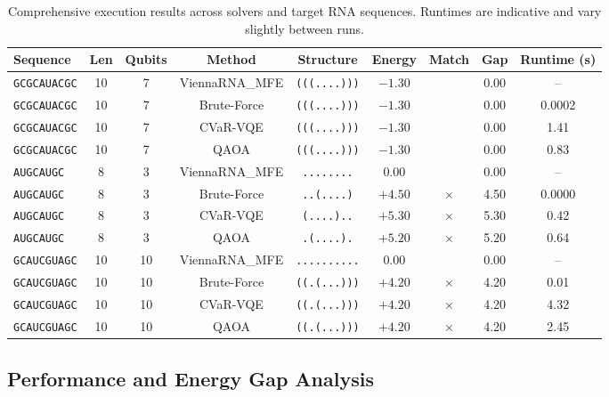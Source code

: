 \documentclass[11pt,a4paper]{article}
\begin{document}
	\begin{table}[htbp]
		\centering
		\caption{Comprehensive execution results across solvers and target RNA sequences. Runtimes are indicative and vary slightly between runs.}
		\label{tab:combined_results}
		\small
		\begin{tabular}{lcccccccc}
			\hline
			\textbf{Sequence} & \textbf{Len} & \textbf{Qubits} & \textbf{Method} & \textbf{Structure} & \textbf{Energy} & \textbf{Match} & \textbf{Gap} & \textbf{Runtime (s)} \\
			\hline
			\texttt{GCGCAUACGC} & 10 & 7 & ViennaRNA\_MFE & \texttt{(((....)))} & $-1.30$ & \checkmark & 0.00 & -- \\
			\texttt{GCGCAUACGC} & 10 & 7 & Brute-Force & \texttt{(((....)))} & $-1.30$ & \checkmark & 0.00 & 0.0002 \\
			\texttt{GCGCAUACGC} & 10 & 7 & CVaR-VQE & \texttt{(((....)))} & $-1.30$ & \checkmark & 0.00 & 1.41 \\
			\texttt{GCGCAUACGC} & 10 & 7 & QAOA & \texttt{(((....)))} & $-1.30$ & \checkmark & 0.00 & 0.83 \\
			\hline
			\texttt{AUGCAUGC} & 8 & 3 & ViennaRNA\_MFE & \texttt{........} & $0.00$ & \checkmark & 0.00 & -- \\
			\texttt{AUGCAUGC} & 8 & 3 & Brute-Force & \texttt{..(....)} & $+4.50$ & $\times$ & 4.50 & 0.0000 \\
			\texttt{AUGCAUGC} & 8 & 3 & CVaR-VQE & \texttt{(....)..} & $+5.30$ & $\times$ & 5.30 & 0.42 \\
			\texttt{AUGCAUGC} & 8 & 3 & QAOA & \texttt{.(....).} & $+5.20$ & $\times$ & 5.20 & 0.64 \\
			\hline
			\texttt{GCAUCGUAGC} & 10 & 10 & ViennaRNA\_MFE & \texttt{..........} & $0.00$ & \checkmark & 0.00 & -- \\
			\texttt{GCAUCGUAGC} & 10 & 10 & Brute-Force & \texttt{((.(...)))} & $+4.20$ & $\times$ & 4.20 & 0.01 \\
			\texttt{GCAUCGUAGC} & 10 & 10 & CVaR-VQE & \texttt{((.(...)))} & $+4.20$ & $\times$ & 4.20 & 4.32 \\
			\texttt{GCAUCGUAGC} & 10 & 10 & QAOA & \texttt{((.(...)))} & $+4.20$ & $\times$ & 4.20 & 2.45 \\
			\hline
		\end{tabular}
	\end{table}
	
	\subsection{Performance and Energy Gap Analysis}
	
\end{document}
